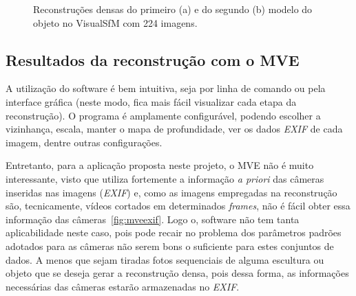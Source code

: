 \begin{figure}[!h]
	\centering
	\caption{Reconstruções densas do primeiro (a) e do segundo (b) modelo do objeto no VisualSfM com 224 imagens.
	}
\end{figure}


\subsection{Resultados da reconstrução com o MVE}

A utilização do software é bem intuitiva, seja por linha de comando ou pela
interface gráfica (neste modo, fica mais fácil visualizar cada etapa da
reconstrução). O programa é amplamente configurável, podendo escolher a vizinhança, escala,
manter o mapa de profundidade, ver os dados \emph{EXIF} de cada imagem, dentre
outras configurações.

Entretanto, para a aplicação proposta neste projeto, o MVE não é muito interessante,
visto que utiliza fortemente a informação \emph{a priori} das câmeras inseridas nas imagens
(\emph{EXIF}) e, como as imagens empregadas na reconstrução são, tecnicamente,
vídeos cortados em determinados \emph{frames}, não é fácil obter essa informação
das câmeras~\ref{fig:mveexif}. Logo o, software não tem tanta aplicabilidade
neste caso, pois pode recair no problema dos parâmetros padrões adotados para as
câmeras não serem bons o suficiente para estes conjuntos de dados. A menos que
sejam tiradas fotos sequenciais de alguma escultura ou objeto que se deseja
gerar a reconstrução densa, pois dessa forma, as informações necessárias das
câmeras estarão armazenadas no \emph{EXIF}.

